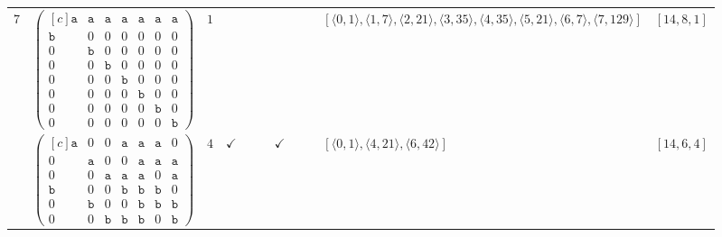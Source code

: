 \documentclass[12pt]{article}
\theoremstyle{definition}
\theoremstyle{plain}
\begin{document}
{\begin{longtable}{@{}cYcccccccZc@{}}

$7$
& $\begin{pmatrix*}[c]
\mathtt{a}   &  \mathtt{a}    &  \mathtt{a}    &   \mathtt{a}  &  \mathtt{a}  &  \mathtt{a}  &  \mathtt{a}  \\
\mathtt{b}   &  0    &  0    &   0  &  0  &  0  &  0  \\
0   &  \mathtt{b}    &  0    &   0  &  0  &  0  &  0  \\
0   &  0    &  \mathtt{b}    &   0  &  0  &  0  &  0  \\
0   &  0    &  0    &   \mathtt{b}  &  0  &  0  &  0  \\
0   &  0    &  0    &   0  &  \mathtt{b}  &  0  &  0  \\
0   &  0    &  0    &   0  &  0  &  \mathtt{b}  &  0  \\
0   &  0    &  0    &   0  &  0  &  0  &  \mathtt{b}
\end{pmatrix*}$
& $1$
&
&
&
&
&
&
& $[\langle0,1\rangle,\allowbreak\langle1,7\rangle,\allowbreak\langle2,21\rangle,\allowbreak\langle3,35\rangle,\allowbreak\langle4,35\rangle,\allowbreak\langle5,21\rangle,\allowbreak\langle6,7\rangle,\allowbreak\langle7,129\rangle]$
& $[14,8,1]$     \\

\cmidrule(lr){2-11}

& $\begin{pmatrix*}[c]
\mathtt{a}   &  0    &  0    &   \mathtt{a}  &  \mathtt{a}  &  \mathtt{a}  &  0  \\
0   &  \mathtt{a}    &  0    &   0  &  \mathtt{a}  &  \mathtt{a}  &  \mathtt{a}  \\
0   &  0    &  \mathtt{a}    &   \mathtt{a}  &  \mathtt{a}  &  0  &  \mathtt{a}  \\
\mathtt{b}   &  0    &  0    &   \mathtt{b}  &  \mathtt{b}  &  \mathtt{b}  & 0  \\
0   &  \mathtt{b}    &  0    &   0  &  \mathtt{b}  &  \mathtt{b}  &  \mathtt{b}  \\
0   &  0    &  \mathtt{b}    &   \mathtt{b}  &  \mathtt{b}  &  0  &  \mathtt{b}
\end{pmatrix*}$
& $4$
& $\checkmark$
&
&
& $\checkmark$
&
&
& $[\langle0,1\rangle,\allowbreak\langle4,21\rangle,\allowbreak\langle6,42\rangle]$
& $[14,6,4]$ \\

\cmidrule(lr){2-11}



\end{longtable}}
\end{document}
